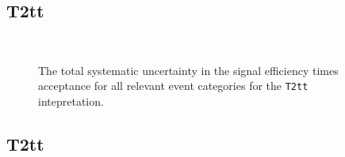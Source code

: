 
\subsection{T2tt\label{app:t2tt}}

\begin{figure}[h!]
  \begin{center}
    \\       
    \caption{\label{fig:sms-total-t2tt}The total systematic
      uncertainty in the signal efficiency times acceptance for all
      relevant event categories for the \texttt{T2tt} intepretation.}
  \end{center}
\end{figure}


\clearpage
\subsection{T2tt\label{app:t2tt}}

